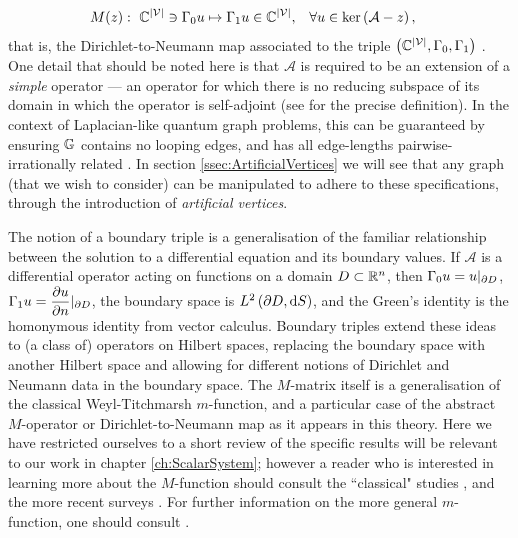 \begin{align*}
	M(z): \ \mathbb{C}^{\left\lvert \mathcal{V} \right\rvert} \ni \Gamma_0 u \mapsto \Gamma_1 u \in \mathbb{C}^{\left\lvert \mathcal{V} \right\rvert},
	 &\quad \forall u\in\mathrm{ker}\left( \mathcal{A}-z \right),
\end{align*}
that is, the Dirichlet-to-Neumann map associated to the triple $\left( \mathbb{C}^{\left\lvert \mathcal{V} \right\rvert},\Gamma_0,\Gamma_1 \right)$ \cite{ershova2014isospectrality, ershova2016isospectrality}.
One detail that should be noted here is that $\mathcal{A}$ is required to be an extension of a \emph{simple} operator --- an operator for which there is no reducing subspace of its domain in which the operator is self-adjoint (see \cite[Section 2.2]{ershova2014isospectrality} for the precise definition).
In the context of Laplacian-like quantum graph problems, this can be guaranteed by ensuring $\mathbb{G}$ contains no looping edges, and has all edge-lengths pairwise-irrationally related \cite{ashurova2014simplicity}.
In section \ref{ssec:ArtificialVertices} we will see that any graph (that we wish to consider) can be manipulated to adhere to these specifications, through the introduction of \emph{artificial vertices}.

The notion of a boundary triple is a generalisation of the familiar relationship between the solution to a differential equation and its boundary values.
If $\mathcal{A}$ is a differential operator acting on functions on a domain $D\subset\mathbb{R}^n$, then $\Gamma_0 u= u\vert_{\partial D}$, $\Gamma_1 u = \dfrac{\partial u}{\partial n}\vert_{\partial D}$, the boundary space is $L^{2}\left( \partial D,\mathrm{d} S \right)$, and the Green's identity is the homonymous identity from vector calculus.
Boundary triples extend these ideas to (a class of) operators on Hilbert spaces, replacing the boundary space with another Hilbert space and allowing for different notions of Dirichlet and Neumann data in the boundary space.
The $M$-matrix itself is a generalisation of the classical Weyl-Titchmarsh $m$-function, and a particular case of the abstract $M$-operator or Dirichlet-to-Neumann map as it appears in this theory.
Here we have restricted ourselves to a short review of the specific results will be relevant to our work in chapter \ref{ch:ScalarSystem}; however a reader who is interested in learning more about the $M$-function should consult the ``classical" studies \cite{kochubei1975extensions, kochubei1980characteristic, gorbachuk1991boundary}, and the more recent surveys \cite{derkach1991generalized, derkach2014boundary}.
For further information on the more general $m$-function, one should consult \cite{titchmarsh1962eigenfunction, atkinson1964discrete}.

